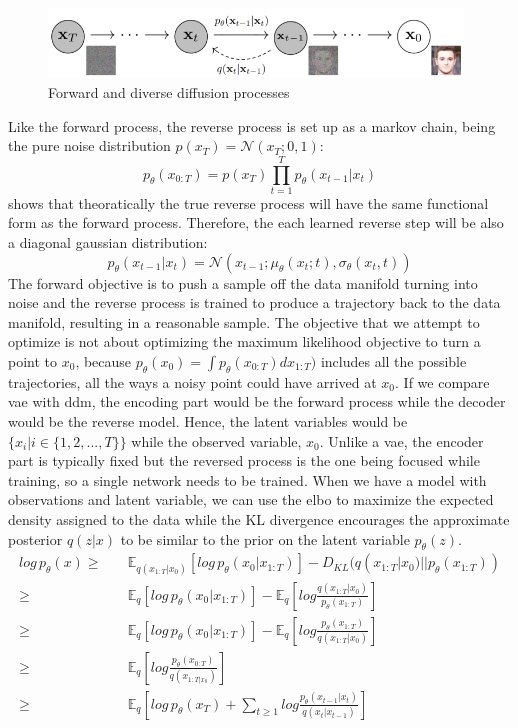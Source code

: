 \documentclass[../main.tex]{subfiles}
\begin{document}
\begin{figure}[H]
	\centering
	\includegraphics[width=11cm]{imgs/relatedwork/forward-reverse-diffusion}
	\caption{Forward and diverse diffusion processes}
	\label{fig:related-forward-reverse-diffusion}
\end{figure}
Like the forward process, the reverse process is set up as a markov chain, being the pure noise distribution $p(x_T) = \mathcal{N}(x_T; 0, 1)$:
\[p_{\theta}(x_{0:T}) = p(x_T) \prod_{t=1}^{T} p_{\theta}(x_{t-1}| x_t)\]
\cite{feller1950} shows that theoratically the true reverse process will have the same functional form as the forward process. Therefore, the each learned reverse step will be also a diagonal gaussian distribution:
\[p_{\theta}(x_{t-1}|x_t) = \mathcal{N}(x_{t-1}; \mu_{\theta}(x_t; t), \sigma_{\theta}(x_t, t))\]
The forward objective is to push a sample off the data manifold turning into noise and the reverse process is trained to produce a trajectory back to the data manifold, resulting in a reasonable sample. The objective that we attempt to optimize is not about optimizing the maximum likelihood objective to turn a point to $x_0$, because $p_{\theta}(x_0) = \int p_{\theta}(x_{0:T}) dx_{1:T})$ includes all the possible trajectories, all the ways a noisy point could have arrived at $x_0$. If we compare \gls{vae} with \gls{ddm}, the encoding part would be the forward process while the decoder would be the reverse model. Hence, the latent variables would be $\{x_i | i \in \{1, 2, ..., T\}\}$ while the observed variable, $x_0$. Unlike a \gls{vae}, the encoder part is typically fixed but the reversed process is the one being focused while training, so a single network needs to be trained. When we have a model with observations and latent variable, we can use the \gls{elbo} to maximize the expected density assigned to the data while the KL divergence encourages the approximate posterior $q(z|x)$ to be similar to the prior on the latent variable $p_{\theta}(z)$.
\begin{align*}
	log \, p_{\theta}(x) \ge& \quad \mathds{E}_{q(x_{1:T}|x_0)}[log \, p_{\theta}(x_0| x_{1:T})] - D_{KL}(q(x_{1:T}| x_0) || p_{\theta}(x_{1:T}))\\
	\ge& \quad \mathds{E}_{q}[log \, p_{\theta}(x_0| x_{1:T})] - \mathds{E}_q[log \frac{q(x_{1:T}| x_0)}{p_{\theta}(x_{1:T})}]\\
	\ge& \quad \mathds{E}_{q}[log \, p_{\theta}(x_0| x_{1:T})] -  \mathds{E}_q[log\frac{p_{\theta}(x_{1:T})}{q(x_{1:T}|x_0)}]\\
	\ge& \quad \mathds{E}_q[log \frac{p_{\theta}(x_{0:T})}{q(x_{1:T|x_0})}]\\
	\ge& \quad \mathds{E}_q[log \, p_{\theta}(x_T) + \sum_{t\ge1}log \frac{p_{\theta}(x_{t-1}|x_t)}{q(x_t| x_{t-1})}]
\end{align*}
\end{document}
